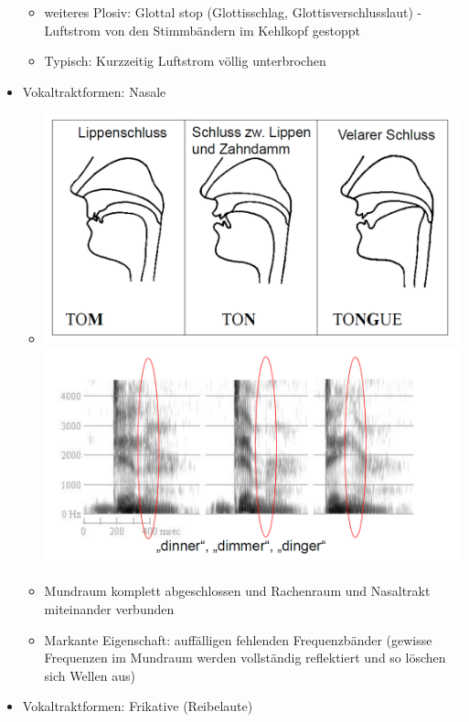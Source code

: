 \documentclass[a4paper,10pt,oneside]{article}
\begin{document}
\begin{itemize}
\begin{itemize}
				\item weiteres Plosiv: Glottal stop (Glottisschlag, Glottisverschlusslaut) - Luftstrom von den Stimmbändern im Kehlkopf gestoppt 
				\item Typisch: Kurzzeitig Luftstrom völlig unterbrochen
			\end{itemize}
		\item Vokaltraktformen: Nasale
			\begin{itemize}
				\item[] \includegraphics[scale=0.15]{Grafiken/1230.png}\includegraphics[scale=0.15]{Grafiken/1231.png}
				\item Mundraum komplett abgeschlossen und Rachenraum und Nasaltrakt miteinander verbunden
				\item Markante Eigenschaft: auffälligen fehlenden Frequenzbänder (gewisse Frequenzen im Mundraum werden vollständig reflektiert und so löschen sich Wellen aus)
			\end{itemize}
		\item Vokaltraktformen: Frikative (Reibelaute)
			\begin{itemize}

\end{itemize}
\end{itemize}
\end{document}
